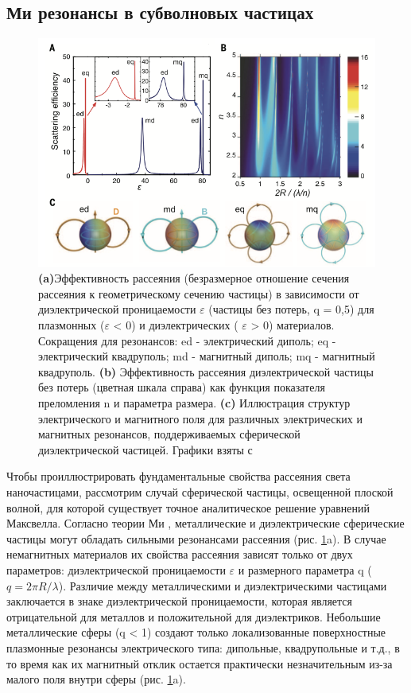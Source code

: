 \subsection*{Ми резонансы в субволновых частицах}

\begin{figure}[h!]
	\centering
	\includegraphics[width=0.7\linewidth]{images/fig1.png}
	\caption{\textbf{(a)}Эффективность рассеяния (безразмерное отношение сечения рассеяния к геометрическому сечению частицы) в зависимости от диэлектрической проницаемости $\varepsilon$ (частицы без потерь, q = 0,5) для плазмонных ($\varepsilon$  < 0) и диэлектрических ( $\varepsilon$ > 0) материалов. Сокращения для резонансов: ed - электрический диполь; eq - электрический квадруполь; md - магнитный диполь; mq - магнитный квадруполь. \textbf{(b)} Эффективность рассеяния диэлектрической частицы без потерь (цветная шкала справа) как функция показателя преломления n и параметра размера. \textbf{(c)} Иллюстрация структур электрического и магнитного поля для различных электрических и магнитных резонансов, поддерживаемых сферической диэлектрической частицей. Графики взяты с \cite{kuznetsov2016optically}}
	\label{fig1}
\end{figure}
\hspace*{2mm}
Чтобы проиллюстрировать фундаментальные свойства рассеяния света наночастицами, рассмотрим случай сферической частицы, освещенной плоской волной, для которой существует точное аналитическое решение уравнений Максвелла. Согласно теории Ми \cite{absorbScattLight}, металлические и диэлектрические сферические частицы могут обладать сильными резонансами рассеяния (рис. \ref{fig1}a). В случае немагнитных материалов их свойства рассеяния зависят только от двух параметров: диэлектрической проницаемости $\varepsilon$  и размерного параметра q ($q = 2\pi R/\lambda$). Различие между металлическими и диэлектрическими частицами заключается в знаке диэлектрической проницаемости, которая является отрицательной для металлов и положительной для диэлектриков. Небольшие металлические сферы (q < 1) создают только локализованные поверхностные плазмонные резонансы электрического типа:  дипольные, квадрупольные и т.д., в то время как их магнитный отклик остается практически незначительным из-за малого поля внутри сферы (рис. \ref{fig1}a).  
